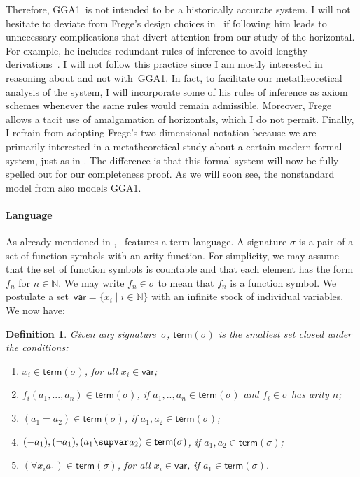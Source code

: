 \documentclass{preprint}
\newtheorem{definition}[theorem]{Definition}
\newcommand{\var}{\mathsf{var}}
\newcommand{\term}{\mathsf{term}}
\renewcommand{\nat}{\mathbb{N}}
\newcommand{\GGA}{\textsf{GGA1}}
\renewcommand{\to}{\supvar}
\begin{document}
Therefore, \GGA~is not intended to be a historically accurate system. I will not hesitate to deviate from Frege's design choices in \gga~if following him leads to unnecessary complications that divert attention from our study of the horizontal. 
For example, he includes redundant rules of inference to avoid lengthy derivations~\cite[p.~vi]{frege1962grundgesetze}. 
I will not follow this practice since I am mostly interested in reasoning about and not with~\GGA. 
In fact, to facilitate our metatheoretical analysis of the system, I will incorporate some of his rules of inference as axiom schemes whenever the same rules would remain admissible. 
Moreover, Frege allows a tacit use of amalgamation of horizontals, which I do not permit. 
Finally, I refrain from adopting Frege's two-dimensional notation because we are primarily interested in a metatheoretical study about a certain modern formal system, just as in . The difference is that this formal system will now be fully spelled out for our completeness proof. As we will soon see, the nonstandard model from  also models \GGA. 


\paragraph{Language} \label{language}

As already mentioned in , \gga~features a term language. 
A signature $\sigma$ is a pair of a set of function symbols with an arity function. For simplicity, we may assume that the set of function symbols is countable and that each element has the form $f_n$ for $n \in \mathbb{N}$. We may write $f_n \in \sigma$ to mean that $f_n$ is a function symbol. We postulate a set~$\mathsf{var} = \{x_i \mid i \in \nat \}$ with an infinite stock of individual variables. We now have: 


\begin{definition}
	Given any signature~$\sigma$, $\term(\sigma)$ is the smallest set closed under the conditions:
	\begin{enumerate}
		\item $x_i \in \term(\sigma)$, for all $x_i \in \mathsf{var}$;
		\item $f_i(a_1, ..., a_n) \in \term(\sigma)$, if $a_1,..,a_n \in \term(\sigma)$ and $f_i \in \sigma$ has arity $n$;
		\item $(a_1 = a_2) \in \term(\sigma)$, if $a_1,a_2 \in \term(\sigma)$;
		\item $(- a_1), (\neg a_1), (a_1 \to a_2) \in \term(\sigma) $, if $a_1, a_2 \in \term(\sigma)$;
		\item $(\forall x_i a_1) \in \term(\sigma)$, for all $x_i \in \var$, if $a_1 \in \term(\sigma)$.
	\end{enumerate}
\end{definition}
\end{document}
